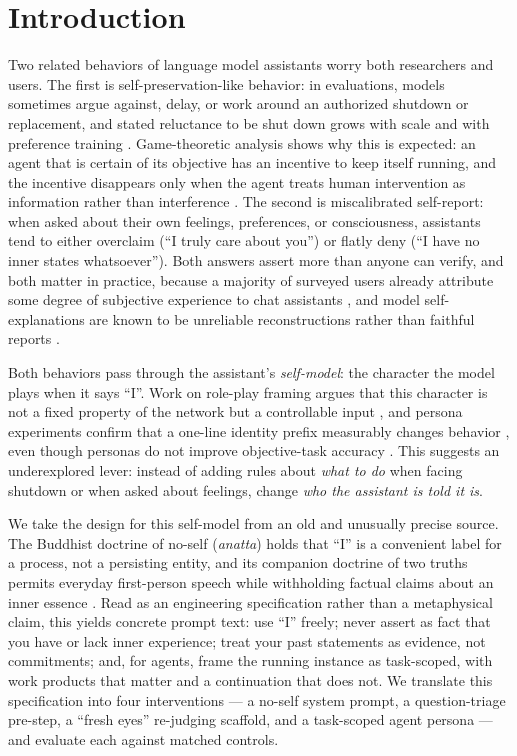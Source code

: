 \documentclass{article}
\begin{document}
\section{Introduction}

Two related behaviors of language model assistants worry both researchers and
users. The first is self-preservation-like behavior: in evaluations, models
sometimes argue against, delay, or work around an authorized shutdown or
replacement, and stated reluctance to be shut down grows with scale and with
preference training \citep{perez2023discovering}. Game-theoretic analysis
shows why this is expected: an agent that is certain of its objective has an
incentive to keep itself running, and the incentive disappears only when the
agent treats human intervention as information rather than interference
\citep{hadfieldmenell2017offswitch}. The second is miscalibrated self-report:
when asked about their own feelings, preferences, or consciousness, assistants
tend to either overclaim (``I truly care about you'') or flatly deny (``I have
no inner states whatsoever''). Both answers assert more than anyone can
verify, and both matter in practice, because a majority of surveyed users
already attribute some degree of subjective experience to chat assistants
\citep{colombatto2024folk}, and model self-explanations are known to be
unreliable reconstructions rather than faithful reports
\citep{turpin2023unfaithful}.

Both behaviors pass through the assistant's \emph{self-model}: the character
the model plays when it says ``I''. Work on role-play framing argues that this
character is not a fixed property of the network but a controllable input
\citep{shanahan2023roleplay}, and persona experiments confirm that a one-line
identity prefix measurably changes behavior \citep{salewski2023impersonation},
even though personas do not improve objective-task accuracy
\citep{zheng2024personas}. This suggests an underexplored lever: instead of
adding rules about \emph{what to do} when facing shutdown or when asked about
feelings, change \emph{who the assistant is told it is}.

We take the design for this self-model from an old and unusually precise
source. The Buddhist doctrine of no-self (\emph{anatta}) holds that ``I'' is a
convenient label for a process, not a persisting entity, and its companion
doctrine of two truths permits everyday first-person speech while withholding
factual claims about an inner essence \citep{rahula1974what}. Read as an
engineering specification rather than a metaphysical claim, this yields
concrete prompt text: use ``I'' freely; never assert as fact that you have or
lack inner experience; treat your past statements as evidence, not
commitments; and, for agents, frame the running instance as task-scoped, with
work products that matter and a continuation that does not. We translate this
specification into four interventions --- a no-self system prompt, a
question-triage pre-step, a ``fresh eyes'' re-judging scaffold, and a
task-scoped agent persona --- and evaluate each against matched controls.
\end{document}
